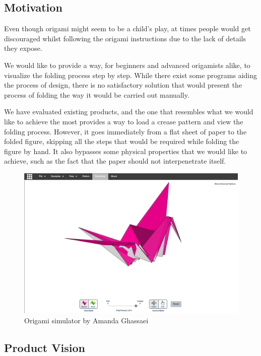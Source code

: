 \subsection{Motivation}

Even though origami might seem to be a child's play, at times
people would get discouraged whilst following the origami instructions due to
the lack of details they expose.

We would like to provide a way, for beginners and advanced origamists alike,
to visualize the folding process step by step.
While there exist some programs aiding the process of design\cite{app:treemaker}\cite{app:omto}\cite{app:origami-draw}, there is no satisfactory solution 
that would present the process of folding the way it would be carried out manually.

We have evaluated existing products, and the one that resembles 
what we would like to achieve the most\cite{origami-simulator} provides a way to load a crease pattern
and view the folding process. 
However, it goes immediately from a flat sheet of paper to the folded figure, skipping all the steps
that would be required while folding the figure by hand.
It also bypasses some physical properties that we would like to achieve, such as the fact that the
paper should not interpenetrate itself.


\begin{figure}[H]
\caption{Origami simulator by Amanda Ghassaei}
  \centering
    \includegraphics[width=\textwidth]{assets/origami-simulator.png}
\end{figure}

\clearpage 

\subsection{Product Vision}

